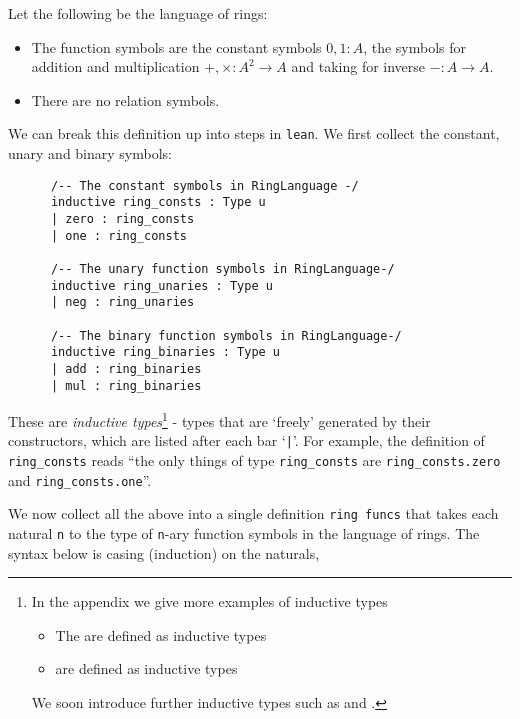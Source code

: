 \begin{dfn}
    Let the following be the language of rings:
    \begin{itemize}
        \item The function symbols are the constant symbols $0, 1 : A$,
        the symbols for addition and multiplication $+ , \times : A^2 \to A$
        and taking for inverse $- : A \to A$.
        \item There are no relation symbols.
    \end{itemize}

    We can break this definition up into steps in \texttt{lean}.
    We first collect the constant, unary and binary symbols:

    \begin{lstlisting}
      /-- The constant symbols in RingLanguage -/
      inductive ring_consts : Type u
      | zero : ring_consts
      | one : ring_consts

      /-- The unary function symbols in RingLanguage-/
      inductive ring_unaries : Type u
      | neg : ring_unaries

      /-- The binary function symbols in RingLanguage-/
      inductive ring_binaries : Type u
      | add : ring_binaries
      | mul : ring_binaries\end{lstlisting}

    These are \textit{inductive types}\footnote{
    In the appendix we give more examples of inductive types %
    \begin{itemize}
      \item The  are defined as inductive types
      \item {} are defined as inductive types
    \end{itemize}
    We soon introduce further inductive types such as
     and . } -
    types that are `freely' generated by their constructors,
    which are listed after each bar `\texttt{|}'.
    For example, the definition of \texttt{ring\_consts} reads
    ``the only things of type \texttt{ring\_consts} are
    \texttt{ring\_consts.zero} and \texttt{ring\_consts.one}''.

    We now collect all the above into a single definition \texttt{ring funcs}
    that takes each natural \texttt{n} to the type of \texttt{n}-ary
    function symbols in the language of rings.
    The syntax below is casing (induction) on the naturals,


\end{dfn}
